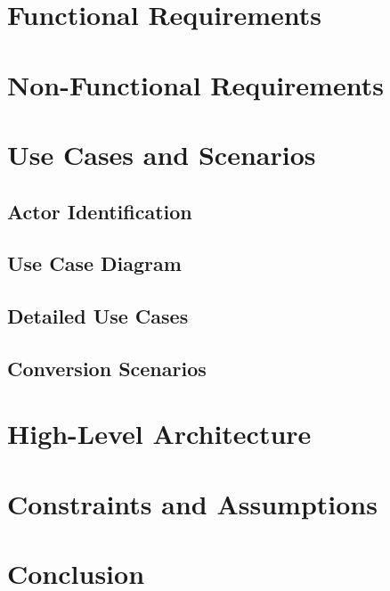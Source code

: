 \documentclass[12pt,a4paper]{report}
\begin{document}
\section{Functional Requirements}
\label{sec:functional-requirements}

\section{Non-Functional Requirements}
\label{sec:nonfunctional-requirements}

\section{Use Cases and Scenarios}
\label{sec:use-cases}

  \subsection{Actor Identification}
  \label{subsec:actors}

  \subsection{Use Case Diagram}
  \label{subsec:use-case-diagram}

  \subsection{Detailed Use Cases}
  \label{subsec:detailed-use-cases}

  \subsection{Conversion Scenarios}
  \label{subsec:conversion-scenarios}

\section{High-Level Architecture}
\label{sec:high-level-arch}

\section{Constraints and Assumptions}
\label{sec:constraints}

\section{Conclusion}
\label{sec:ch3-conclusion}
\end{document}
